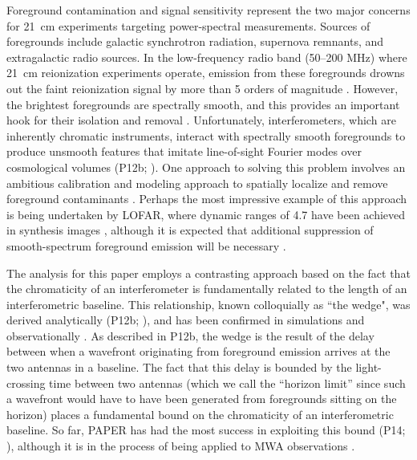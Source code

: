 \documentclass[twocolumn,numberedappendix]{emulateapj} \shorttitle{PSA64}
\begin{document}
Foreground contamination and signal sensitivity represent the two major concerns for 21~cm
experiments targeting power-spectral measurements. Sources of foregrounds include
galactic synchrotron radiation, supernova remnants, and extragalactic radio sources.
In the low-frequency radio band (50--200 MHz) where 21~cm reionization experiments operate,
emission from these foregrounds
drowns out the faint reionization signal by more than 5 orders of magnitude
\citep{deoliveira2008,jelic_et_al2008,santos_et_al2005}.
However, the brightest foregrounds are spectrally smooth, and this provides an important hook
for their isolation and removal \citep{liu_tegmark2012,petrovic_oh2011,liu_et_al2009}.  Unfortunately, interferometers, which are inherently chromatic
instruments, interact with spectrally smooth foregrounds to produce unsmooth features that
imitate line-of-sight Fourier modes over cosmological volumes (P12b; \citealt{bowman_et_al2009,morales_et_al2006a}).
One approach to solving this problem involves an ambitious calibration and modeling approach to spatially localize and
remove foreground contaminants \citep{chapman_et_al2013,sullivan_et_al2012,harker_et_al2009,liu_et_al2008,bowman_et_al2008}.
Perhaps the most impressive example of this approach is being undertaken by LOFAR, where dynamic ranges of 4.7 have
been achieved in synthesis images \citep{yatawatta_et_al2013}, although it is expected that additional
suppression of smooth-spectrum foreground emission will be necessary \citep{chapman_et_al2013}.

The analysis for this paper employs a contrasting
approach based on the fact that the chromaticity of an interferometer
is fundamentally related to the length of an interferometric baseline.  This relationship, known
colloquially as ``the wedge", was 
derived analytically (P12b; \citealt{vedantham_et_al2012}), and has been confirmed in 
simulations \citep{datta_et_al2010,hazelton_et_al2013} and observationally
\citep{pober_et_al2013,dillon_et_al2013b}.  As described in P12b, the wedge is the result of the delay
between when a wavefront originating from foreground emission
arrives at the two antennas in a baseline.  The fact that this delay is bounded by the light-crossing
time between two antennas (which we call the ``horizon limit'' since such a wavefront would have to have
been generated from foregrounds sitting on the horizon) places a fundamental bound on the chromaticity of
an interferometric baseline.  So far, PAPER has had the most success in exploiting this bound
(P14; \citealt{jacobs_et_al2014}), although it is in the process of being applied to MWA
observations \citep{nitya}.  
\end{document}
